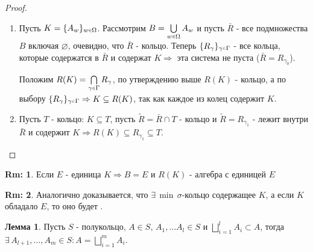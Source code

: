 \documentclass[12pt]{article}
\theoremstyle{definition}
\newtheorem{rem}{Rm:}
\newtheorem{lemma}{Лемма}
\newcommand{\smallerrel}[1]{\mathrel{\mathpalette\smallerrelaux{#1}}}
\newcommand{\smallerrelaux}[2]{\raisebox{.1ex}{\scalebox{.75}{$#1#2$}}}
\newcommand{\smallin}{\smallerrel{\in}}
\begin{document}
\begin{proof}\hfill
	\begin{enumerate}[label={(\arabic*)}]
		\item 	Пусть $K = \{A_w\}_{w \smallin \Omega}$. Рассмотрим $B = \bigcup\limits_{w \smallin \Omega}A_w$ и пусть $\bar{R}$ - все подмножества $B$ включая $\varnothing$, очевидно, что $\bar{R}$ - кольцо. Теперь $\{R_\gamma\}_{\gamma \smallin \Gamma}$ - все кольца, которые содержатся в $\bar{R}$ и содержат $K \Rightarrow$ эта система не пуста ($\bar{R} = R_{\gamma_0}$).
		
		Положим $R(K) = \bigcap\limits_{\gamma \smallin \Gamma} R_\gamma$, по утверждению выше $R(K)$ - кольцо, а по выбору $\{R_\gamma\}_{\gamma \smallin \Gamma} \Rightarrow K \subseteq R(K)$, так как каждое из колец содержит $K$.
		
		\item Пусть $T$ - кольцо: $K \subseteq T$, пусть $\widetilde{R} = \bar{R} \cap T$ - кольцо и $\widetilde{R} = R_{\gamma_1}$ - лежит внутри $\bar{R}$ и содержит $K \Rightarrow R(K) \subseteq R_{\gamma_1} \subseteq T$.
	\end{enumerate}
\end{proof}

\begin{rem}
	Если $E$ - единица $K \Rightarrow B = E$ и $R(K)$ - алгебра с единицей $E$
\end{rem}

\begin{rem}
	Аналогично доказывается, что $\exists \, \min \, \sigma$-кольцо содержащее $K$, а если $K$ обладало $E$, то оно будет .
\end{rem}

\begin{lemma}
	Пусть $S$ - полукольцо, $A \in S,\, A_1, \dotsc A_l \in S$ и $\bigsqcup\limits_{i=1}^{l}A_i \subset A$, тогда $\exists \, A_{l+1}, \dotsc, A_m \in S \colon A = \bigsqcup\limits_{i=1}^{m}A_i$.
\end{lemma}
\end{document}
